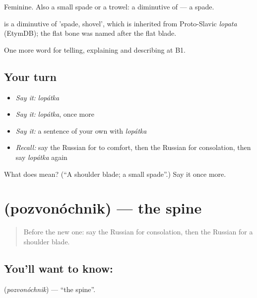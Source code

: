 Feminine. Also a small spade or a trowel: a diminutive of \emph{} — a spade.

\begin{cousinweb}
\emph{} is a diminutive of \emph{} 'spade, shovel', which is inherited from Proto-Slavic \emph{lopata} (EtymDB); the flat bone was named after the flat blade.
\end{cousinweb}

\begin{grammarlens}[title={What you've built}]
One more word for telling, explaining and describing at B1.
\end{grammarlens}

\subsection*{Your turn}
\begin{itemize}
\raggedright
  \item \emph{Say it:} \emph{lopátka}
  \item \emph{Say it:} \emph{lopátka}, once more
  \item \emph{Say it:} a sentence of your own with \emph{lopátka}
  \item \emph{Recall:} say the Russian for to comfort, then the Russian for consolation, then say \emph{lopátka} again
\end{itemize}

\begin{tcolorbox}[breakable,colback=teal!4,colframe=teal!35!black,title={Before you move on}]
What does  mean? (\textquotedblleft{}A shoulder blade; a small spade\textquotedblright{}.) Say it once more.
\end{tcolorbox}
\section[\texorpdfstring{\ru{позвоночник} (pozvonóchnik)}{позвоночник (pozvonóchnik)}]{ (pozvonóchnik) — the spine}

\label{lesson:RU-C481-pozvonochnik}



\begin{quote}
Before the new one: say the Russian for consolation, then the Russian for a shoulder blade.
\end{quote}

\subsection*{You'll want to know: }
\textbf{} (\emph{pozvonóchnik}) — \textquotedblleft{}the spine\textquotedblright{}.

